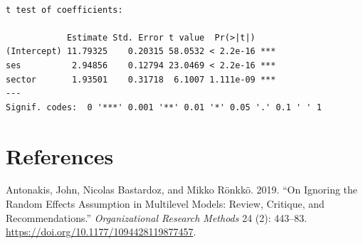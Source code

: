 \documentclass[
  letterpaper,
  DIV=11,
  numbers=noendperiod]{scrreprt}
\newlength{\cslhangindent}
\newlength{\cslentryspacingunit} %
\newenvironment{CSLReferences}[2] %
 {%
  \setlength{\parindent}{0pt}
  \ifodd #1
  \let\oldpar\par
  \def\par{\hangindent=\cslhangindent\oldpar}
  \fi
  \setlength{\parskip}{#2\cslentryspacingunit}
 }%
 {}
\begin{document}
\begin{verbatim}

t test of coefficients:

            Estimate Std. Error t value  Pr(>|t|)    
(Intercept) 11.79325    0.20315 58.0532 < 2.2e-16 ***
ses          2.94856    0.12794 23.0469 < 2.2e-16 ***
sector       1.93501    0.31718  6.1007 1.111e-09 ***
---
Signif. codes:  0 '***' 0.001 '**' 0.01 '*' 0.05 '.' 0.1 ' ' 1
\end{verbatim}


\hypertarget{references}{%
\chapter*{References}\label{references}}


\hypertarget{refs}{}
\begin{CSLReferences}{1}{0}
\leavevmode{}%
Antonakis, John, Nicolas Bastardoz, and Mikko Rönkkö. 2019. {``On
Ignoring the Random Effects Assumption in Multilevel Models: Review,
Critique, and Recommendations.''} \emph{Organizational Research Methods}
24 (2): 443--83. \url{https://doi.org/10.1177/1094428119877457}.

\end{CSLReferences}
\end{document}
